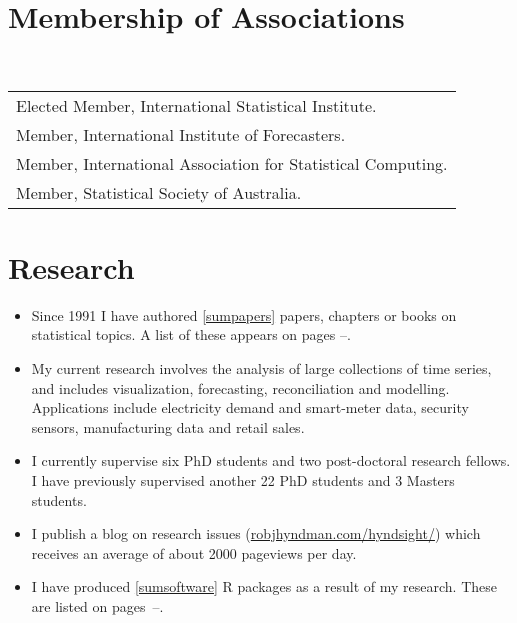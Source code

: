 \documentclass[a4paper,10pt]{article}
\begin{document}
\section{Membership of Associations}

~\begin{tabular}{@{~$\bullet$~~}l}
Elected Member, International Statistical Institute.\\
Member, International Institute of Forecasters.\\
Member, International Association for Statistical Computing.\\
Member, Statistical Society of Australia.
\end{tabular}

\section{Research}

\begin{itemize}\parskip=0cm
\item Since 1991 I have authored \ref{sumpapers} papers, chapters or books on statistical topics. A list of these appears on pages \pageref{papersstart}--\pageref{papersend}.
\item  My current research involves the analysis of large collections of time series, and includes visualization, forecasting, reconciliation and modelling. Applications include electricity demand and smart-meter data, security sensors, manufacturing data and retail sales.
\item I currently supervise six PhD students and two post-doctoral research fellows. I have previously supervised another 22 PhD students and 3 Masters students.
\item I publish a blog on research issues (\url{robjhyndman.com/hyndsight/}) which receives an average of about 2000 pageviews per day.
\item I have produced \ref{sumsoftware} R packages as a result of my research. These are listed on pages~\pageref{sumreports}--\pageref{sumsoftware}.
\end{itemize}

\clearpage
\end{document}
